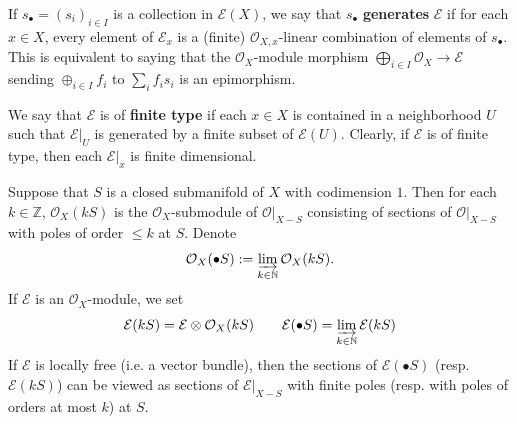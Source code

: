\documentclass[11pt,b5paper,notitlepage]{article}
\theoremstyle{definition}
\theoremstyle{plain}
\newcommand{\mc}{\mathcal}
\newcommand{\scr}{\mathscr}
\newcommand{\blt}{\bullet}
\newcommand{\Nbb}{\mathbb N}
\newcommand{\Zbb}{\mathbb Z}
\newcommand{\<}{\left\langle}
\renewcommand{\>}{\right\rangle}
\newcommand{\MO}{\mathcal{O}}
\newcommand{\ME}{\mathcal{E}}
\numberwithin{equation}{subsection}
\begin{document}
If $s_\blt=(s_i)_{i\in I}$ is a collection in $\scr E(X)$, we say that $s_\blt$ \textbf{generates} $\scr E$ if for each $x\in X$, every element of $\scr E_x$ is a (finite) $\mc O_{X,x}$-linear combination of elements of $s_\blt$. This is equivalent to saying that the $\mc O_X$-module morphism $\bigoplus_{i\in I}\mc O_X\rightarrow \scr E$ sending $\oplus_{i\in I}f_i$ to $\sum_i f_is_i$ is an epimorphism.

We say that $\scr E$ is of \textbf{finite type} if each $x\in X$ is contained in a neighborhood $U$ such that $\scr E|_U$ is generated by a finite subset of $\scr E(U)$. Clearly, if $\scr E$ is of finite type, then each $\scr E|_x$ is finite dimensional.

Suppose that $S$ is a closed submanifold of $X$ with codimension $1$. Then for each $k\in \Zbb$, $\mc O_X(kS)$ is the $\mc O_X$-submodule of $\MO\vert_{X- S}$ consisting of sections of $\MO\vert_{X- S}$ with poles of order $\leq k$ at $S$. Denote 
    \begin{align*}
        \MO_X(\blt S):=\varinjlim_{k\in \Nbb}\MO_X(k S).
    \end{align*}
If $\ME$ is an $\MO_X$-module, we set \index{ES@$\mc E(kS),\mc E(\blt S)$}
    \begin{gather*}
\mc E(kS)=\mc E\otimes\mc O_X(kS)\qquad \mc E(\blt S)=\varinjlim_{k\in \Nbb}\ME(k S)
    \end{gather*}
    If $\mc E$ is locally free (i.e. a vector bundle), then the sections of $\mc E(\blt S)$ (resp. $\mc E(k S)$) can be viewed as sections of $\mc E|_{X- S}$ with finite poles (resp. with poles of orders at most $k$) at $S$.
\end{document}
